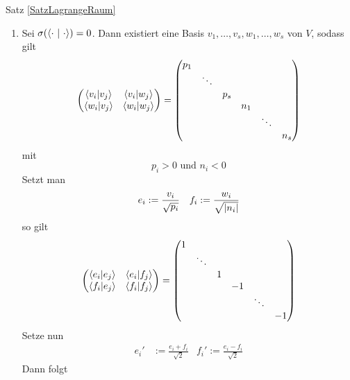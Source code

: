 \begin{Beweis}{Satz \ref{SatzLagrangeRaum}}
\begin{enumerate}[1.)]
\item Sei $\sigma(\left<\cdot ~|~\cdot\right>) = 0$. Dann existiert eine Basis $v_1, \ldots, v_s, w_1,\ldots, w_s$ von $V$, sodass gilt
\begin{align*}
\left(
\begin{matrix}
\left<v_i|v_j\right> & \left<v_i|w_j\right>\\
\left<w_i|v_j\right> & \left<w_i | w_j\right>
\end{matrix}
\right)
=
\left(
\begin{matrix}
	p_1 &        &     &     &        &  \\
	    & \ddots &     &     &        &     \\
	    &        & p_s &     &        &     \\
	    &        &     & n_1 &        &     \\
	    &        &     &     & \ddots &     \\
	    &        &     &     &        & n_s
\end{matrix}
\right)
\end{align*}
mit
\[ p_i > 0 \text{  und  } n_i < 0 \]
Setzt man
\begin{align*}
&e_i := \frac{v_i}{\sqrt{p_i}}
&f_i := \frac{w_i}{\sqrt{\left|n_i\right|}}
\end{align*}
so gilt
\begin{align*}
\left(
\begin{matrix}
\left<e_i|e_j\right> & \left<e_i|f_j\right>\\
\left<f_i|e_j\right> & \left<f_i | f_j\right>
\end{matrix}
\right)
=
\left(
\begin{matrix}
	1 &        &   &    &        &  \\
	  & \ddots &   &    &        &    \\
	  &        & 1 &    &        &    \\
	  &        &   & -1 &        &    \\
	  &        &   &    & \ddots &    \\
	  &        &   &    &        & -1
\end{matrix}
\right)
\end{align*}
Setze nun
\begin{align*}
e_i' &:= \frac{e_i + f_i}{\sqrt{2}} &f_i' := \frac{e_i - f_i}{\sqrt{2}}
\end{align*}
Dann folgt
\begin{align*}

\end{align*}
\end{enumerate}
\end{Beweis}
